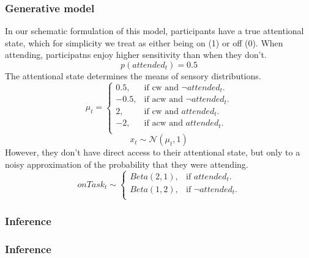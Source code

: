 \documentclass[12pt,twoside]{reedthesis}
\begin{document}
\hypertarget{generative-model-6}{%
\subsubsection*{Generative model}\label{generative-model-6}}

In our schematic formulation of this model, participants have a true attentional state, which for simplicity we treat as either being on (1) or off (0). When attending, participatns enjoy higher sensitivity than when they don't.
\begin{equation}
    p(attended_t)= 0.5
\end{equation}
The attentional state determines the means of sensory distributions.
\begin{equation}
  \mu_t=\begin{cases}
    0.5, & \text{if cw and $\neg attended_t$}.\\
    -0.5, & \text{if acw and $\neg attended_t$}.\\
    2, & \text{if cw and $attended_t$}.\\
    -2, & \text{if acw and $attended_t$}.\\
  \end{cases}
\end{equation}
\begin{equation}
   x_t \sim \mathcal{N}(\mu_t,1)    
\end{equation}
However, they don't have direct access to their attentional state, but only to a noisy approximation of the probability that they were attending.
\begin{equation}
onTask_t \sim \begin{cases}
    Beta(2, 1), & \text{if $attended_t$}.\\
    Beta(1, 2), & \text{if $\neg attended_t$}.\\
  \end{cases}
\end{equation}
\subsubsection{Inference}

\hypertarget{inference-6}{%
\subsubsection*{Inference}\label{inference-6}}
\end{document}
